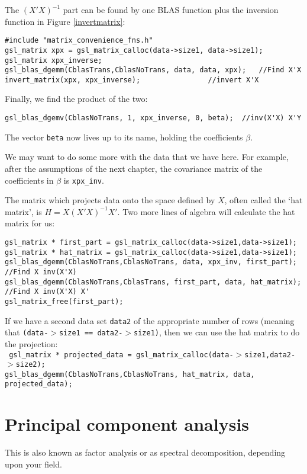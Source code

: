 The $(X'X)^{-1}$ part can be found by one BLAS function plus the inversion function in Figure \ref{invertmatrix}: \label{ols}
\begin{verbatim}
#include "matrix_convenience_fns.h"
gsl_matrix xpx = gsl_matrix_calloc(data->size1, data->size1);
gsl_matrix xpx_inverse;
gsl_blas_dgemm(CblasTrans,CblasNoTrans, data, data, xpx);	//Find X'X
invert_matrix(xpx, xpx_inverse);				//invert X'X
\end{verbatim}

Finally, we find the product of the two:
\begin{verbatim}
gsl_blas_dgemv(CblasNoTrans, 1, xpx_inverse, 0, beta);	//inv(X'X) X'Y
\end{verbatim}

The vector {\tt beta} now lives up to its name, holding the coefficients $\beta$.

We may want to do some more with the data that we have here. For example, after the assumptions of the
next chapter, the covariance matrix of the coefficients in $\beta$ is {\tt xpx\_inv}.

The matrix which projects data onto the space defined by $X$, often
called the `hat matrix', is $H = X(X'X)^{-1}X'$. Two more lines of algebra will calculate the hat matrix
for us:

\begin{verbatim}
gsl_matrix * first_part = gsl_matrix_calloc(data->size1,data->size1);
gsl_matrix * hat_matrix = gsl_matrix_calloc(data->size1,data->size1);
gsl_blas_dgemm(CblasNoTrans,CblasNoTrans, data, xpx_inv, first_part);	//Find X inv(X'X)
gsl_blas_dgemm(CblasNoTrans,CblasTrans, first_part, data, hat_matrix);	//Find X inv(X'X) X'
gsl_matrix_free(first_part);
\end{verbatim}

If we have a second data set {\tt data2} of the appropriate number of
rows (meaning that {\tt (data-$>$size1 == data2-$>$size1)}, then we can use the hat matrix to do the projection:\\
{\tt
gsl\_matrix * projected\_data = gsl\_matrix\_calloc(data-$>$size1,data2-$>$size2);\\
gsl\_blas\_dgemm(CblasNoTrans,CblasNoTrans, hat\_matrix, data, projected\_data);
}




\section{Principal component analysis} This is also known as factor
analysis or as spectral decomposition, depending upon your field. 

